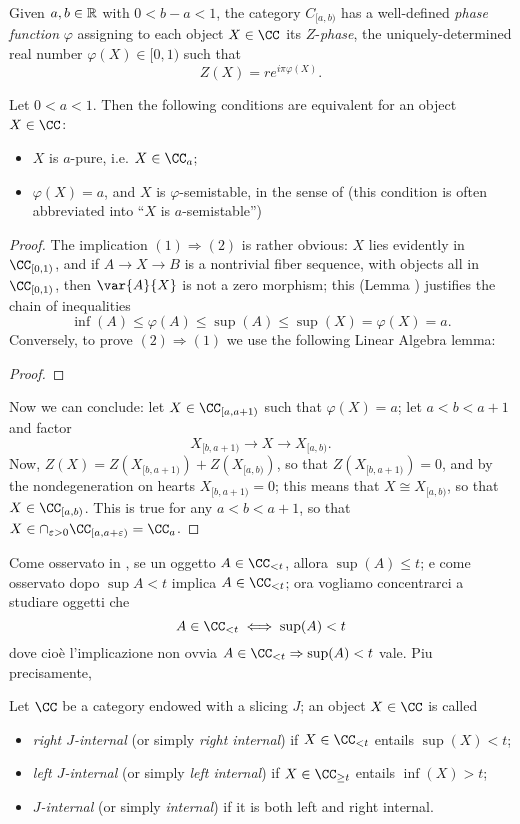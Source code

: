Given $a,b\in\mathbb{R}$ with $ 0< b-a <1$, the category $C_{[a,b)}$ has a well-defined \emph{phase function} $\varphi$ assigning to each object $X\in\CC$ its $Z$-\emph{phase}, the uniquely-determined real number $\varphi(X)\in[0,1)$ such that
\[
Z(X) = r e^{i\pi\varphi(X)}.
\]
\begin{proposition}
Let $0 < a < 1$. Then the following conditions are equivalent for an object $X\in\CC$:
\begin{itemize}[noitemsep]
\item $X$ is $a$-pure, i.e. $X\in\CC_{a}$;
\item $\varphi(X)=a$, and $X$ is $\varphi$\hyp{}semistable, in the sense of \adef {} (this condition is often abbreviated into ``$X$ is $a$\hyp{}semistable'')
\end{itemize}
\end{proposition}
\begin{proof}
The implication $(1)\Rightarrow (2)$ is rather obvious: $X$ lies evidently in $\CC_{[0,1)}$, and if $A\to X\to B$ is a nontrivial fiber sequence, with objects all in $\CC_{[0,1)}$, then $\var{A}{X}$ is not a zero morphism; this (Lemma ) justifies the chain of inequalities
\[
\inf(A)\le \varphi(A)\le \sup(A)\le \sup(X) = \varphi(X)=a.
\]
Conversely, to prove $(2)\Rightarrow (1)$ we use the following Linear Algebra lemma:
\begin{lemma}

\end{lemma}
\begin{proof}

\end{proof}
Now we can conclude: let $X\in \CC_{[a,a+1)}$ such that $\varphi(X)=a$; let $a < b< a+1$ and factor 
\[
X_{[b, a+1)}\to X\to X_{[a,b)}.
\]
Now, $Z(X) = Z(X_{[b, a+1)}) + Z(X_{[a,b)})$, so that $Z(X_{[b, a+1)})=0$, and by the nondegeneration on hearts $X_{[b, a+1)}=0$; this means that $X\cong X_{[a,b)}$, so that $X\in \cab$. This is true for any $a<b<a+1$, so that $X\in \cap_{\eps > 0} \CC_{[a,a+\eps)} = \CC_a$.
\end{proof}
Come osservato in , se un oggetto $A\in \CC_{<t}$, allora $\sup(A)\le t$; e come osservato dopo $\sup A < t$ implica $A\in \CC_{<t}$; ora vogliamo concentrarci a studiare oggetti che
\[
A\in \CC_{<t} \iff \sup(A) < t
\]
dove cio\`e l'implicazione non ovvia $A\in \CC_{<t}\Rightarrow \sup(A) < t$ vale. Piu precisamente,
\begin{definition}
Let $\CC$ be a category endowed with a slicing $J$; an object $X\in\CC$ is called
\begin{itemize}
\item \emph{right $J$\hyp{}internal} (or simply \emph{right internal}) if $X\in \CC_{<t}$ entails $\sup(X) < t$;
\item \emph{left $J$\hyp{}internal} (or simply \emph{left internal}) if $X\in\CC_{\ge t}$ entails $\inf(X) > t$;
\item \emph{$J$\hyp{}internal} (or simply \emph{internal}) if it is both left and right internal.
\end{itemize}
\end{definition}

